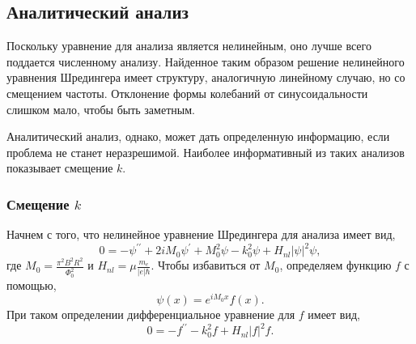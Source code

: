 \documentclass[A4,12pt,oneside]{article}
\renewcommand{\(}{\left(}
\renewcommand{\)}{\right)}
\begin{document}
\subsection{Аналитический анализ}
Поскольку уравнение для анализа является нелинейным, оно лучше всего поддается численному анализу. Найденное таким образом решение нелинейного уравнения Шредингера имеет структуру, аналогичную линейному случаю, но со смещением частоты. Отклонение формы колебаний от синусоидальности слишком мало, чтобы быть заметным.

Аналитический анализ, однако, может дать определенную информацию, если проблема не станет неразрешимой. Наиболее информативный из таких анализов показывает смещение $k$.



\subsubsection{Смещение $k$}

Начнем с того, что нелинейное уравнение Шредингера для анализа имеет вид,
\begin{equation}
0 = - \psi^{\prime\prime} + 2 i M_0 \psi^\prime + M_0^2\psi-k_0^2\psi + H_{nl} \left|\psi\right|^2 \psi,
\end{equation}
где $M_0 = \frac{\pi^2 B^2R^2}{\Phi^2_0}$ и $H_{nl} = \mu \frac{m_e}{\left|e\right|\hbar}$. 
Чтобы избавиться от $M_0$, определяем функцию $f$ с помощью,
\begin{equation}
\psi \left(x\right) = e^{i M_0 x} f\left(x\right).
\end{equation}
При таком определении дифференциальное уравнение для $f$ имеет вид,
\begin{equation}
0 = - f^{\prime\prime} - k_0^2 f + H_{nl} \left|f\right|^2 f.
\end{equation}
\end{document}
